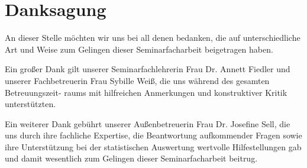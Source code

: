 \chapter*{Danksagung}

An dieser Stelle möchten wir uns bei all denen bedanken, die auf unterschiedliche
Art und Weise zum Gelingen dieser Seminarfacharbeit beigetragen haben.

Ein großer Dank gilt unserer Seminarfachlehrerin Frau Dr. Annett Fiedler und unserer
Fachbetreuerin Frau Sybille Weiß, die uns während des gesamten Betreuungszeit-
raums mit hilfreichen Anmerkungen und konstruktiver Kritik unterstützten.

Ein weiterer Dank gebührt unserer Außenbetreuerin Frau Dr. Josefine Sell, die uns durch ihre fachliche Expertise, die Beantwortung aufkommender Fragen sowie ihre Unterstützung bei der statistischen Auswertung wertvolle Hilfestellungen gab und damit wesentlich zum Gelingen dieser Seminarfacharbeit beitrug.
%


